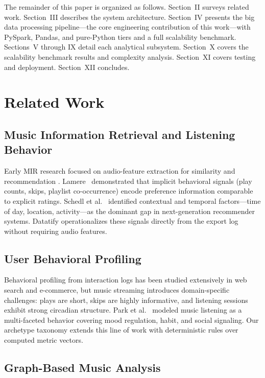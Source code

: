 \documentclass[conference]{IEEEtran}
\begin{document}
The remainder of this paper is organized as follows. Section~II surveys
related work. Section~III describes the system architecture. Section~IV
presents the big data processing pipeline—the core engineering contribution
of this work—with PySpark, Pandas, and pure-Python tiers and a full
scalability benchmark. Sections~V through IX detail each analytical
subsystem. Section~X covers the scalability benchmark results and complexity
analysis. Section~XI covers testing and deployment. Section~XII concludes.

\section{Related Work}

\subsection{Music Information Retrieval and Listening Behavior}

Early MIR research focused on audio-feature extraction for similarity and
recommendation \cite{celma2010music, knees2013survey}. Lamere~\cite{lamere2008social}
demonstrated that implicit behavioral signals (play counts, skips,
playlist co-occurrence) encode preference information comparable to explicit
ratings. Schedl et al.~\cite{schedl2018challenges} identified contextual and
temporal factors—time of day, location, activity—as the dominant gap in
next-generation recommender systems. Datatify operationalizes these signals
directly from the export log without requiring audio features.

\subsection{User Behavioral Profiling}

Behavioral profiling from interaction logs has been studied extensively in
web search \cite{agichtein2006improving} and e-commerce, but music streaming
introduces domain-specific challenges: plays are short, skips are highly
informative, and listening sessions exhibit strong circadian structure.
Park et al.~\cite{park2019multifaceted} modeled music listening as a
multi-faceted behavior covering mood regulation, habit, and social signaling.
Our archetype taxonomy extends this line of work with deterministic rules over
computed metric vectors.

\subsection{Graph-Based Music Analysis}
\end{document}
